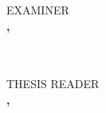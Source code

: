 \documentclass[a4paper, 12pt]{report}
\begin{document}
                \begin{minipage}[t]{.44\textwidth}\centering
                    EXAMINER\\
                    \vspace{0.1 cm} 
                    \textbf{\MakeUppercase{\examiner}, \examinerdegree}\\
                    \small{
                    \examinerposition\\
                    \examineruniv}
                \end{minipage}\\
    
                \vspace{0.75 cm} 
                THESIS READER\\
                \vspace{0.1 cm} 
                \textbf{\MakeUppercase{\reader}, \readerdegree}\\
                \small{
                \readerposition\\
                \readeruniv}\\
                \vspace{0.75 cm} 
            \fi
            
\end{document}
